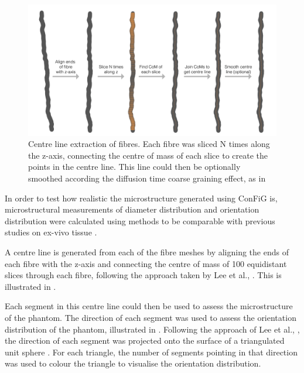 \begin{figure}
  \centering
  \includegraphics[width=\textwidth]{figures/config/centre_line_extraction-01.png}
  \caption[Mesh centreline extraction]{Centre line extraction of fibres. Each fibre was sliced N times along the z-axis, connecting the centre of mass of each slice to create the points in the centre line. This line could then be optionally smoothed according the diffusion time coarse graining effect, as in \cite{Lee2019b}}
  \label{fig:config_micro_centreline}
\end{figure}

In order to test how realistic the microstructure generated using ConFiG is, microstructural measurements of diameter distribution and orientation distribution were calculated using methods to be comparable with previous studies on ex-vivo tissue \cite{Abdollahzadeh2019,Lee2019b}.

A centre line is generated from each of the fibre meshes by aligning the ends of each fibre with the z-axis and connecting the centre of mass of 100 equidistant slices through each fibre, following the approach taken by Lee et al., \cite{Lee2019b}. This is illustrated in .

Each segment in this centre line could then be used to assess the microstructure of the phantom. The direction of each segment was used to assess the orientation distribution of the phantom, illustrated in . Following the approach of Lee et al., \cite{Lee2019b}, the direction of each segment was projected onto the surface of a triangulated unit sphere \cite{Womersley2018}. For each triangle, the number of segments pointing in that direction was used to colour the triangle to visualise the orientation distribution.

